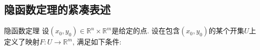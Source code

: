

\subsection{隐函数定理的紧凑表述}
\begin{theorem}{隐函数定理}
设$(x_0,y_0)\in\mathbb{R}^n\times\mathbb{R}^m$是给定的点. 设在包含$(x_0,y_0)$的某个开集$U$上定义了映射$F:U\to\mathbb{R}^m$, 满足如下条件:
\end{theorem}
